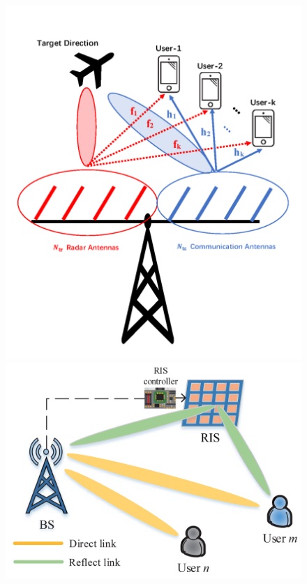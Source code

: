 \documentclass[9pt]{beamer}
\begin{document}
\begin{frame}
  \begin{figure}
    \centering
    \includegraphics[totalheight=3cm]{Fig3.png}
    \includegraphics[totalheight=3cm]{Fig4.png}
  \end{figure}

\end{frame}
\end{document}
